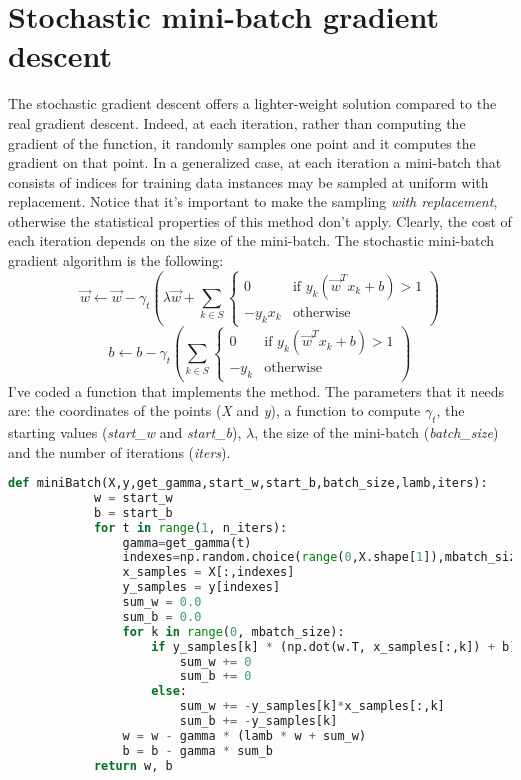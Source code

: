 \section{Stochastic mini-batch gradient descent}
    The stochastic gradient descent offers a lighter-weight solution compared to the real gradient descent. Indeed, at each iteration, rather than computing the gradient of the function, it randomly samples one point and it computes the gradient on that point. In a generalized case, at each iteration a mini-batch that consists of indices for training data instances may be sampled at uniform with replacement. Notice that it's important to make the sampling \emph{with replacement}, otherwise the statistical properties of this method don't apply. Clearly, the cost of each iteration depends on the size of the mini-batch. The stochastic mini-batch gradient algorithm is the following:
    \[
        \vec{w} \leftarrow \vec{w} - \gamma_t\left(\lambda\vec{w}+\sum_{k \in S}
        \begin{cases}
            0       & \text{if } y_k(\vec{w}^Tx_k + b)>1 \\
            -y_kx_k & \text{otherwise}
        \end{cases}
        \right)
    \]
    \[
        b \leftarrow b - \gamma_t\left(\sum_{k \in S}
        \begin{cases}
            0       & \text{if } y_k(\vec{w}^Tx_k + b)>1 \\
            -y_k    & \text{otherwise}
        \end{cases}
        \right)
    \]
    I've coded a function that implements the method. The parameters that it needs are: the coordinates of the points (\emph{X} and \emph{y}), a function to compute \(\gamma_t\), the starting values (\emph{start\_w} and \emph{start\_b}), \(\lambda\), the size of the mini-batch (\emph{batch\_size}) and the number of iterations (\emph{iters}).
    \begin{lstlisting}[language=Python]
        def miniBatch(X,y,get_gamma,start_w,start_b,batch_size,lamb,iters):
            w = start_w
            b = start_b
            for t in range(1, n_iters):
                gamma=get_gamma(t)
                indexes=np.random.choice(range(0,X.shape[1]),mbatch_size)
                x_samples = X[:,indexes]
                y_samples = y[indexes]
                sum_w = 0.0
                sum_b = 0.0
                for k in range(0, mbatch_size):
                    if y_samples[k] * (np.dot(w.T, x_samples[:,k]) + b)>1:
                        sum_w += 0
                        sum_b += 0
                    else:
                        sum_w += -y_samples[k]*x_samples[:,k]
                        sum_b += -y_samples[k]
                w = w - gamma * (lamb * w + sum_w)
                b = b - gamma * sum_b
            return w, b
    \end{lstlisting}

